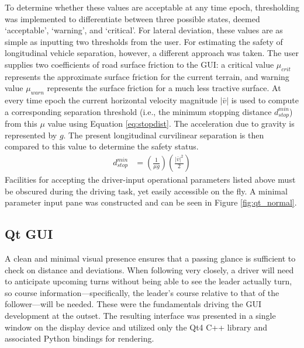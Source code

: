 \documentclass[twocolumn,10pt]{article}
\begin{document}
  To determine whether these values are acceptable at any time epoch, thresholding was implemented to differentiate between three possible states, deemed `acceptable', `warning', and `critical'.
  For lateral deviation, these values are as simple as inputting two thresholds from the user.  For estimating the safety of longitudinal vehicle separation, however, a different approach was taken.  The user supplies two coefficients of road surface friction to the GUI: a critical value $\mu_{crit}$ represents the approximate surface friction for the current terrain, and warning value $\mu_{warn}$ represents the surface friction for a much less tractive surface.  At every time epoch the current horizontal velocity magnitude $|\bar{v}|$ is used to compute a corresponding separation threshold (i.e., the minimum stopping distance $d_{stop}^{min}$) from this $\mu$ value using Equation \ref{eq:stopdist}.  The acceleration due to gravity is represented by $g$.  The present longitudinal curvilinear separation is then compared to this value to determine the safety status.
  \begin{align} \label{eq:stopdist}
    d_{stop}^{min} &= \left( \frac {1} {\mu g} \right) \left(\frac {|\bar{v}|^2} {2} \right)
  \end{align}  %
  Facilities for accepting the driver-input operational parameters listed above must be obscured during the driving task, yet easily accessible on the fly.  A minimal parameter input pane was constructed and can be seen in Figure \ref{fig:qt_normal}.


  \subsection*{Qt GUI}
  
    A clean and minimal visual presence ensures that a passing glance is sufficient to check on distance and deviations.  When following very closely, a driver will need to anticipate upcoming turns without being able to see the leader actually turn, so course information---specifically, the leader's course relative to that of the follower---will be needed.  These were the fundamentals driving the GUI development at the outset.  The resulting interface was presented in a single window on the display device and utilized only the Qt4 C++ library \cite{qt} and associated Python bindings for rendering.
\end{document}
